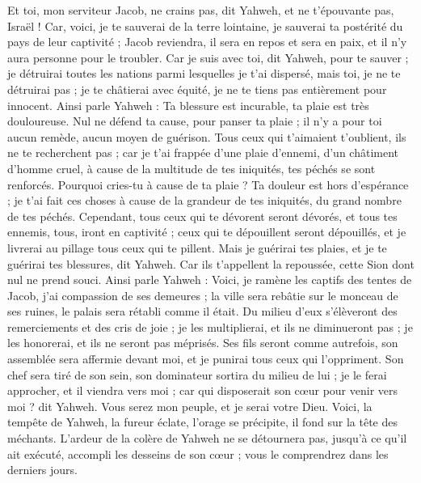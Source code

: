 \begin{multicols}{2}
Et toi, mon serviteur Jacob, ne crains pas, dit Yahweh, et ne t'épouvante pas, Israël ! Car, voici, je te sauverai de la terre lointaine, je sauverai ta postérité du pays de leur captivité ; Jacob reviendra, il sera en repos et sera en paix, et il n'y aura personne pour le troubler.
Car je suis avec toi, dit Yahweh, pour te sauver ; je détruirai toutes les nations parmi lesquelles je t'ai dispersé, mais toi, je ne te détruirai pas ; je te châtierai avec équité, je ne te tiens pas entièrement pour innocent.
Ainsi parle Yahweh : Ta blessure est incurable, ta plaie est très douloureuse.
Nul ne défend ta cause, pour panser ta plaie ; il n'y a pour toi aucun remède, aucun moyen de guérison.
Tous ceux qui t'aimaient t'oublient, ils ne te recherchent pas ; car je t'ai frappée d'une plaie d'ennemi, d'un châtiment d'homme cruel, à cause de la multitude de tes iniquités, tes péchés se sont renforcés.
Pourquoi cries-tu à cause de ta plaie ? Ta douleur est hors d'espérance ; je t'ai fait ces choses à cause de la grandeur de tes iniquités, du grand nombre de tes péchés.
Cependant, tous ceux qui te dévorent seront dévorés, et tous tes ennemis, tous, iront en captivité ; ceux qui te dépouillent seront dépouillés, et je livrerai au pillage tous ceux qui te pillent.
Mais je guérirai tes plaies, et je te guérirai tes blessures, dit Yahweh. Car ils t'appellent la repoussée, cette Sion dont nul ne prend souci.
Ainsi parle Yahweh : Voici, je ramène les captifs des tentes de Jacob, j'ai compassion de ses demeures ; la ville sera rebâtie sur le monceau de ses ruines, le palais sera rétabli comme il était.
Du milieu d'eux s'élèveront des remerciements et des cris de joie ; je les multiplierai, et ils ne diminueront pas ; je les honorerai, et ils ne seront pas méprisés.
Ses fils seront comme autrefois, son assemblée sera affermie devant moi, et je punirai tous ceux qui l'oppriment.
Son chef sera tiré de son sein, son dominateur sortira du milieu de lui ; je le ferai approcher, et il viendra vers moi ; car qui disposerait son cœur pour venir vers moi ? dit Yahweh.
Vous serez mon peuple, et je serai votre Dieu.
Voici, la tempête de Yahweh, la fureur éclate, l'orage se précipite, il fond sur la tête des méchants.
L'ardeur de la colère de Yahweh ne se détournera pas, jusqu'à ce qu'il ait exécuté, accompli les desseins de son cœur ; vous le comprendrez dans les derniers jours.

\end{multicols}
